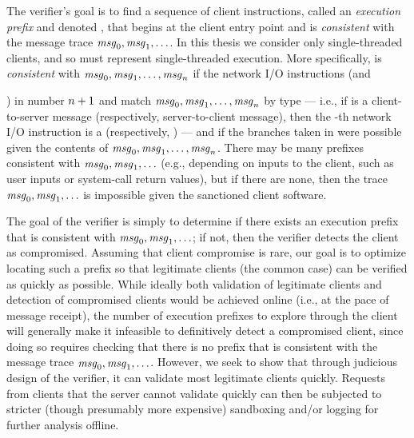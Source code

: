 The verifier's goal is to find a sequence of client instructions,
called an \textit{execution prefix} and denoted \execPrefix{}, that
begins at the client entry point and is \textit{consistent} with the
message trace $\mathit{msg}_{0}, \mathit{msg}_{1}, \ldots$.  In this thesis we consider
only single-threaded clients, and so \execPrefix{} must represent
single-threaded execution.  More specifically, \execPrefix{\msgNmbr}
is \textit{consistent} with $\mathit{msg}_{0}, \mathit{msg}_{1}, \ldots, \mathit{msg}_{n}$
if the network I/O instructions (\sendInstr and
\recvInstr{}) in \execPrefix{\msgNmbr} number $n+1$ and match
$\mathit{msg}_{0}, \mathit{msg}_{1}, \ldots, \mathit{msg}_{n}$ by type --- i.e., if
\msg{\msgIdx} is a client-to-server message (respectively,
server-to-client message), then the \msgIdx-th network I/O instruction is a
\sendInstr (respectively, \recvInstr) --- and if the branches taken
in \execPrefix{\msgNmbr} were possible given the contents of $\mathit{msg}_{0},
\mathit{msg}_{1}, \ldots, \mathit{msg}_{n}$.  There may be many prefixes
\execPrefix{} consistent with $\mathit{msg}_{0}, \mathit{msg}_{1}, \ldots$ (e.g.,
depending on inputs to the client, such as user inputs or system-call
return values), but if there are none, then the trace $\mathit{msg}_{0},
\mathit{msg}_{1}, \ldots$ is impossible given the sanctioned client software.

The goal of the verifier is simply to determine if there exists an
execution prefix that is consistent with $\mathit{msg}_{0}, \mathit{msg}_{1}, \ldots$;
if not, then the verifier detects the client as compromised.
Assuming that client compromise is rare, our goal is to optimize
locating such a prefix so that legitimate clients (the common case)
can be verified as quickly as possible.  While ideally both validation
of legitimate clients and detection of compromised clients would be
achieved online (i.e., at the pace of message receipt),
the number of execution prefixes to explore through the client will
generally make it infeasible to definitively detect a compromised
client, since doing so requires checking that there is no prefix
\execPrefix{} that is consistent with the message trace $\mathit{msg}_{0},
\mathit{msg}_{1}, \ldots$.  However, we seek to show that through judicious
design of the verifier, it can validate most legitimate clients
quickly.  Requests from clients that the server cannot validate quickly
can then be subjected to stricter (though presumably more expensive)
sandboxing and/or logging for further analysis offline.

